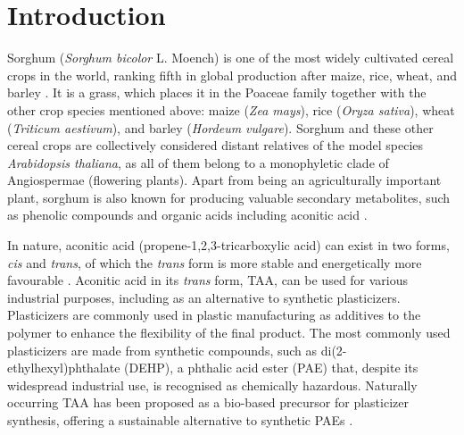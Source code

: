 \chapter{Introduction}

\hspace{1em}Sorghum (\textit{Sorghum bicolor} L. Moench) is one of the most widely cultivated cereal crops in the world, ranking fifth in global production after maize, rice, wheat, and barley \cite{silvaProgressChallengesSorghum2022a}. It is a grass, which places it in the Poaceae family together with the other crop species mentioned above: maize (\textit{Zea mays}), rice (\textit{Oryza sativa}), wheat (\textit{Triticum aestivum}), and barley (\textit{Hordeum vulgare}). Sorghum and these other cereal crops are collectively considered distant relatives of the model species \textit{Arabidopsis thaliana}, as all of them belong to a monophyletic clade of Angiospermae (flowering plants).
Apart from being an agriculturally important plant, sorghum is also known for producing valuable secondary metabolites, such as phenolic compounds \cite{chibrikovSweetSorghumJuice2024} and organic acids including aconitic acid \cite{bruniAconiticAcidRecovery2022a}.

\hspace{1em}In nature, aconitic acid (propene-1,2,3-tricarboxylic acid) can exist in two forms, \textit{cis} and \textit{trans}, of which the \textit{trans} form is more stable and energetically more favourable \cite{bruniAconiticAcidRecovery2022a} \cite{igamberdievOrganicAcidsPools2016}. Aconitic acid in its \textit{trans} form, TAA, can be used for various industrial purposes, including as an alternative to synthetic plasticizers.
Plasticizers are commonly used in plastic manufacturing as additives to the polymer to enhance the flexibility of the final product. The most commonly used plasticizers are made from synthetic compounds, such as di(2-ethylhexyl)phthalate (DEHP), a phthalic acid ester (PAE) that, despite its widespread industrial use, is recognised as chemically hazardous. Naturally occurring TAA has been proposed as a bio-based precursor for plasticizer synthesis, offering a sustainable alternative to synthetic PAEs \cite{bruniAconiticAcidRecovery2022a}.

